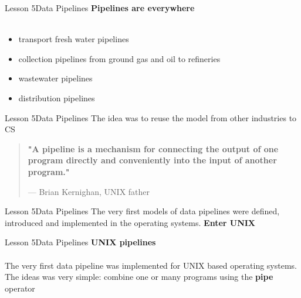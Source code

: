\documentclass[aspectratio=1610]{beamer}
\begin{document}
\begin{frame}{Lesson 5}{Data Pipelines}
\LARGE
\textbf{Pipelines are everywhere}\\~\\
\begin{itemize}
    \item transport fresh water pipelines
    \item collection pipelines from ground gas and oil to refineries
    \item wastewater pipelines
    \item distribution pipelines
\end{itemize}
\end{frame}


\begin{frame}
\end{frame}



\begin{frame}{Lesson 5}{Data Pipelines}
\Huge
 The idea was to reuse the model from other industries to CS
 \end{frame}


\begin{frame}
\begin{center}
\Huge
\begin{quote}
\textbf{"A pipeline is a mechanism for connecting the output of one program directly and conveniently into the 
    input of another program."}
\begin{flushright}
{--- Brian Kernighan, UNIX father}	
\end{flushright}
\end{quote}
\end{center}
\end{frame}


\begin{frame}{Lesson 5}{Data Pipelines}
\Huge
 The very first models of data pipelines were defined, introduced and 
 implemented in the operating systems. \textbf{Enter UNIX}
 \end{frame}




\begin{frame}{Lesson 5}{Data Pipelines}
\LARGE
\textbf{UNIX pipelines}\\~\\
The very first data pipeline was implemented for UNIX based operating
systems. The ideas was very simple: combine one or many programs 
using the \textbf{pipe} operator \text{\textbar}
\end{frame}
\end{document}
